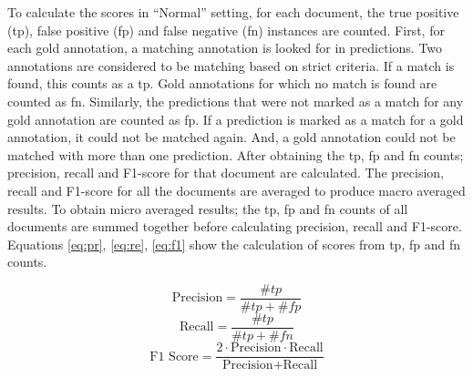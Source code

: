 \documentclass{report}
\theoremstyle{definition}
\theoremstyle{remark}
\begin{document}
To calculate the scores in ``Normal'' setting, for each document, the true positive (tp), false positive (fp) and false negative (fn) instances are counted. First, for each gold annotation, a matching annotation is looked for in predictions. Two annotations are considered to be matching based on strict criteria. If a match is found, this counts as a tp. Gold annotations for which no match is found are counted as fn. Similarly, the predictions that were not marked as a match for any gold annotation are counted as fp. If a prediction is marked as a match for a gold annotation, it could not be matched again. And, a gold annotation could not be matched with more than one prediction. After obtaining the tp, fp and fn counts; precision, recall and F1-score for that document are calculated. The precision, recall and F1-score for all the documents are averaged to produce macro averaged results. To obtain micro averaged results; the tp, fp and fn counts of all documents are summed together before calculating precision, recall and F1-score. Equations \ref{eq:pr}, \ref{eq:re}, \ref{eq:f1} show the calculation of scores from tp, fp and fn counts.

\begin{equation}
\label{eq:pr}
    \text{Precision} = \frac{\#tp}{\#tp+\#fp} 
\end{equation}
\begin{equation}
\label{eq:re}
    \text{Recall} = \frac{\#tp}{\#tp+\#fn} 
\end{equation}
\begin{equation}
\label{eq:f1}
    \text{F1 Score} = \frac{2\cdot\text{Precision}\cdot\text{Recall}}{\text{Precision}+\text{Recall}} 
\end{equation}
\end{document}

